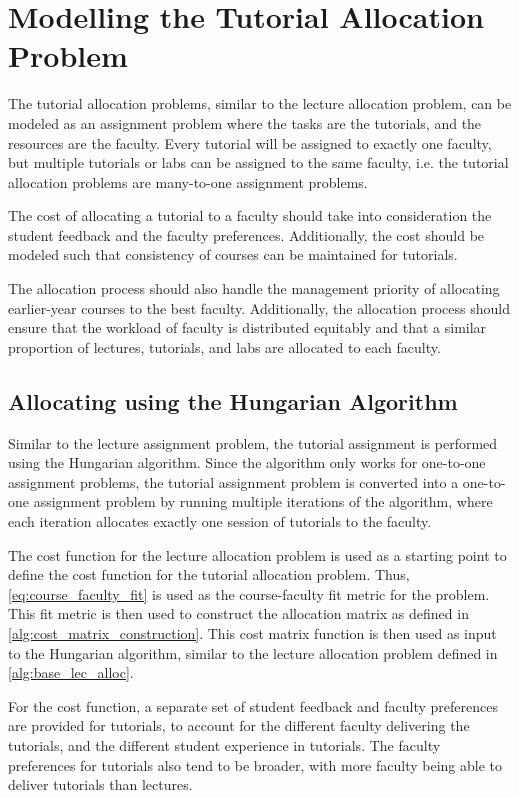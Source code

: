 \section{Modelling the Tutorial Allocation Problem}

The tutorial allocation problems, similar to the lecture allocation problem, can be modeled as an assignment problem where the tasks are the tutorials, and the resources are the faculty. Every tutorial will be assigned to exactly one faculty, but multiple tutorials or labs can be assigned to the same faculty, i.e. the tutorial allocation problems are many-to-one assignment problems.

The cost of allocating a tutorial to a faculty should take into consideration the student feedback and the faculty preferences. Additionally, the cost should be modeled such that consistency of courses can be maintained for tutorials.

The allocation process should also handle the management priority of allocating earlier-year courses to the best faculty. Additionally, the allocation process should ensure that the workload of faculty is distributed equitably and that a similar proportion of lectures, tutorials, and labs are allocated to each faculty.

\subsection{Allocating using the Hungarian Algorithm}

Similar to the lecture assignment problem, the tutorial assignment is performed using the Hungarian algorithm. Since the algorithm only works for one-to-one assignment problems, the tutorial assignment problem is converted into a one-to-one assignment problem by running multiple iterations of the algorithm, where each iteration allocates exactly one session of tutorials to the faculty.

The cost function for the lecture allocation problem is used as a starting point to define the cost function for the tutorial allocation problem. Thus, \autoref{eq:course_faculty_fit} is used as the course-faculty fit metric for the problem. This fit metric is then used to construct the allocation matrix as defined in \autoref{alg:cost_matrix_construction}. This cost matrix function is then used as input to the Hungarian algorithm, similar to the lecture allocation problem defined in \autoref{alg:base_lec_alloc}.

For the cost function, a separate set of student feedback and faculty preferences are provided for tutorials, to account for the different faculty delivering the tutorials, and the different student experience in tutorials. The faculty preferences for tutorials also tend to be broader, with more faculty being able to deliver tutorials than lectures.

